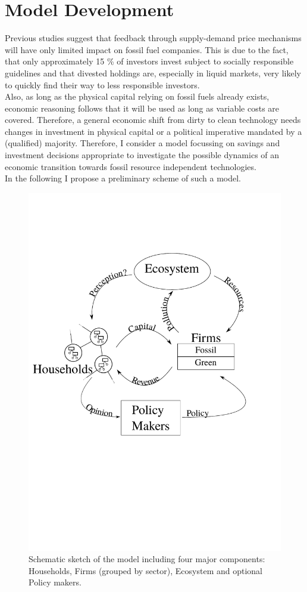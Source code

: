 
\section{Model Development} 

Previous studies \cite{Ans2013} suggest that feedback through supply-demand price mechanisms will have only limited impact on fossil fuel companies. This is due to the fact, that only approximately 15 \% of investors invest subject to socially responsible guidelines \cite{SIF2014Report} and that divested holdings are, especially in liquid markets, very likely to quickly find their way to less responsible investors. \\
Also, as long as the physical capital relying on fossil fuels already exists, economic reasoning follows that it will be used as long as variable costs are covered.
Therefore, a general economic shift from dirty to clean technology needs changes in investment in physical capital or a political imperative mandated by a (qualified) majority. Therefore, I consider a model focussing on savings and investment decisions appropriate to investigate the possible dynamics of an economic transition towards fossil resource independent technologies.\\
In the following I propose a preliminary scheme of such a model.

\begin{figure}[t]
	\centering
	\includegraphics[width =.7 \textwidth]{figures/Model_Scheme.pdf}
	\caption{Schematic sketch of the model including four major components: Households, Firms (grouped by sector), Ecosystem and optional Policy makers.}
	\label{fig:model}
\end{figure}

